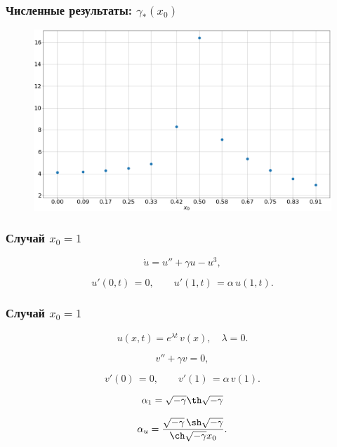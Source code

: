 \documentclass[fullscreen=true, unicode, bookmarks=false]{beamer}
\begin{document}
\begin{frame}
\frametitle{ Численные результаты: $ \gamma_*(x_0) $ }

\begin{figure} 
\includegraphics[scale=0.4]{x0-gamma_star.png}  
\end{figure}

\end{frame}

\begin{frame}
\frametitle{ Случай $ x_0 = 1 $ }

\begin{equation}
	\dot u = u'' + \gamma u - u^3,	
\end{equation}

\begin{equation}	
	u'(0, t) \, = 0, \qquad u'(1, t) \, = \alpha\,u(1, t).
\end{equation}

\end{frame}

\begin{frame}
\frametitle{ Случай $ x_0 = 1 $ }

$$ u(x, t) = e^{\lambda t} \, v(x), \quad \lambda = 0. $$

\bigskip
\pause
 
\begin{equation}
	v'' + \gamma v = 0,	
\end{equation}

\begin{equation}	
	v'(0) \, = 0, \qquad v'(1) \, = \alpha\,v(1).
\end{equation}

\bigskip
\pause

$$ \alpha_1 = \sqrt{-\gamma} \th \sqrt{-\gamma} $$

$$ \alpha_u = \frac{ \sqrt{-\gamma} \, \sh \sqrt{-\gamma} }{ \ch \sqrt{-\gamma} x_0 }. $$

\end{frame}
\end{document}
